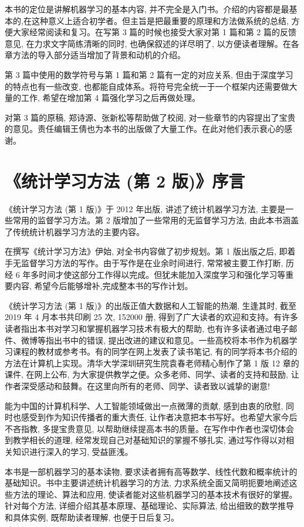 \documentclass[10pt]{article}
\begin{document}
\begin{CJK*}{UTF8}{bsmi}
本书的定位是讲解机器学习的基本内容, 并不完全是入门书。介绍的内容都是最基本的,在这种意义上适合初学者。但主旨是把最重要的原理和方法做系统的总结, 方便大家经常阅读和复习。在写第 3 篇的时候也接受大家对第 1 篇和第 2 篇的反馈意见, 在力求文字简练清晰的同时, 也确保叙述的详尽明了, 以方便读者理解。在各章方法的导入部分适当增加了背景和动机的介绍。

第 3 篇中使用的数学符号与第 1 篇和第 2 篇有一定的对应关系, 但由于深度学习的特点也有一些改变, 也都能自成体系。将符号完全统一于一个框架内还需要做大量的工作, 希望在增加第 4 篇强化学习之后再做处理。

对第 3 篇的原稿, 郑诗源、张新松等帮助做了校阅, 对一些章节的内容提出了宝贵的意见。责任编辑王倩也为本书的出版做了大量工作。在此对他们表示衰心的感谢。

\section*{《统计学习方法 (第 2 版)》序言}
《统计学习方法 (第 1 版)》于 2012 年出版, 讲述了统计机器学习方法, 主要是一些常用的监督学习方法。第 2 版增加了一些常用的无监督学习方法, 由此本书涵盖了传统统计机器学习方法的主要内容。

在撰写《统计学习方法》伊始, 对全书内容做了初步规划。第 1 版出版之后, 即着手无监督学习方法的写作。由于写作是在业余时间进行, 常常被主要工作打断, 历经 6 年多时间才使这部分工作得以完成。但犹未能加入深度学习和强化学习等重要内容, 希望今后能够增补,完成整本书的写作计划。

《统计学习方法 (第 1 版)》的出版正值大数据和人工智能的热潮, 生逢其时, 截至 2019 年 4 月本书共印刷 25 次, 152000 册, 得到了广大读者的欢迎和支持。有许多读者指出本书对学习和掌握机器学习技术有极大的帮助, 也有许多读者通过电子邮件、微博等指出书中的错误, 提出改进的建议和意见。一些高校将本书作为机器学习课程的教材或参考书。有的同学在网上发表了读书笔记, 有的同学将本书介绍的方法在计算机上实现。清华大学深圳研究生院袁春老师精心制作了第 1 版 12 章的课件, 在网上公布, 为大家提供教学之便。众多老师、同学、读者的支持和鼓励, 让作者深受感动和鼓舞。在这里向所有的老师、同学、读者致以诚挚的谢意!

能为中国的计算机科学、人工智能领域做出一点微薄的贡献, 感到由衷的欣慰, 同时也感受到作为知识传播者的重大责任, 让作者决意把本书写好。也希望大家今后不吝指教, 多提宝贵意见, 以帮助继续提高本书的质量。在写作中作者也深切体会到教学相长的道理, 经常发现自己对基础知识的掌握不够扎实, 通过写作得以对相关知识进行深入的学习, 受益匪浅。

本书是一部机器学习的基本读物, 要求读者拥有高等数学、线性代数和概率统计的基础知识。书中主要讲述统计机器学习的方法, 力求系统全面又简明扼要地阐述这些方法的理论、算法和应用, 使读者能对这些机器学习的基本技术有很好的掌握。针对每个方法, 详细介绍其基本原理、基础理论、实际算法, 给出细致的数学推导和具体实例, 既帮助读者理解, 也便于日后复习。


\end{CJK*}
\end{document}
